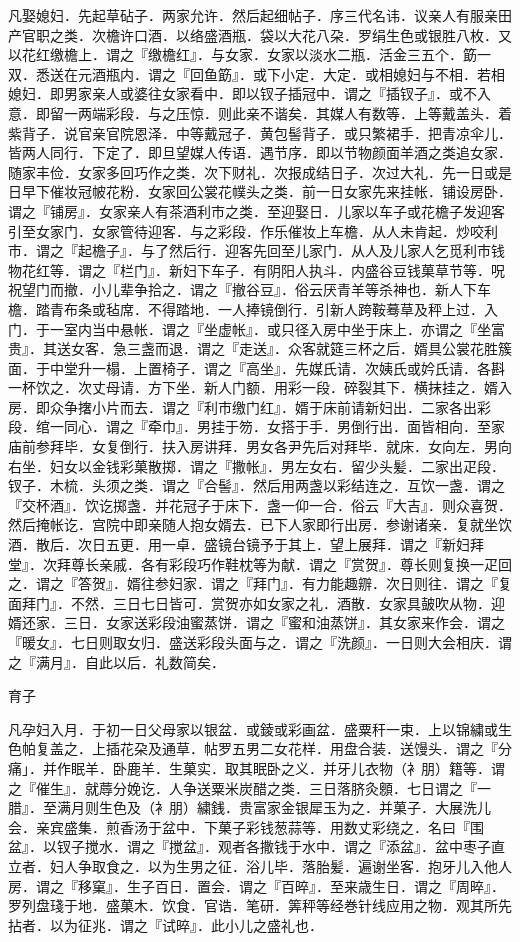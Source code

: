 \documentclass[]{article}
\begin{document}
凡娶媳妇．先起草砧子．两家允许．然后起细帖子．序三代名讳．议亲人有服亲田产官职之类．次檐许口酒．以络盛酒瓶．袋以大花八朶．罗绢生色或银胜八枚．又以花红缴檐上．谓之『缴檐红』．与女家．女家以淡水二瓶．活金三五个．筯一双．悉送在元酒瓶内．谓之『回鱼筯』．或下小定．大定．或相媳妇与不相．若相媳妇．即男家亲人或婆往女家看中．即以钗子插冠中．谓之『插钗子』．或不入意．即留一两端彩段．与之压惊．则此亲不谐矣．其媒人有数等．上等戴盖头．着紫背子．说官亲官院恩泽．中等戴冠子．黄包髻背子．或只繁裙手．把青凉伞儿．皆两人同行．下定了．即旦望媒人传语．遇节序．即以节物颜面羊酒之类追女家．随家丰俭．女家多回巧作之类．次下财礼．次报成结日子．次过大礼．先一日或是日早下催妆冠帔花粉．女家回公裳花幞头之类．前一日女家先来挂帐．铺设房卧．谓之『铺房』．女家亲人有茶酒利市之类．至迎娶日．儿家以车子或花檐子发迎客引至女家门．女家管待迎客．与之彩段．作乐催妆上车檐．从人未肯起．炒咬利市．谓之『起檐子』．与了然后行．迎客先回至儿家门．从人及儿家人乞觅利市钱物花红等．谓之『栏门』．新妇下车子．有阴阳人执斗．内盛谷豆钱菓草节等．呪祝望门而撤．小儿辈争拾之．谓之『撤谷豆』．俗云厌青羊等杀神也．新人下车檐．踏青布条或毡席．不得踏地．一人捧镜倒行．引新人跨鞍蓦草及秤上过．入门．于一室内当中悬帐．谓之『坐虚帐』．或只径入房中坐于床上．亦谓之『坐富贵』．其送女客．急三盏而退．谓之『走送』．众客就筵三杯之后．婿具公裳花胜簇面．于中堂升一榻．上置椅子．谓之『高坐』．先媒氏请．次姨氏或妗氏请．各斟一杯饮之．次丈母请．方下坐．新人门额．用彩一段．碎裂其下．横抹挂之．婿入房．即众争撦小片而去．谓之『利市缴门红』．婿于床前请新妇出．二家各出彩段．绾一同心．谓之『牵巾』．男挂于笏．女搭于手．男倒行出．面皆相向．至家庙前参拜毕．女复倒行．扶入房讲拜．男女各尹先后对拜毕．就床．女向左．男向右坐．妇女以金钱彩菓散掷．谓之『撒帐』．男左女右．留少头髪．二家出疋段．钗子．木梳．头须之类．谓之『合髻』．然后用两盏以彩结连之．互饮一盏．谓之『交杯酒』．饮讫掷盏．并花冠子于床下．盏一仰一合．俗云『大吉』．则众喜贺．然后掩帐讫．宫院中即亲随人抱女婿去．已下人家即行出房．参谢诸亲．复就坐饮酒．散后．次日五更．用一卓．盛镜台镜予于其上．望上展拜．谓之『新妇拜堂』．次拜尊长亲戚．各有彩段巧作鞋枕等为献．谓之『赏贺』．尊长则复换一疋回之．谓之『答贺』．婿往参妇家．谓之『拜门』．有力能趣辧．次日则往．谓之『复面拜门』．不然．三日七日皆可．赏贺亦如女家之礼．酒散．女家具皷吹从物．迎婿还家．三日．女家送彩段油蜜蒸饼．谓之『蜜和油蒸饼』．其女家来作会．谓之『暖女』．七日则取女归．盛送彩段头面与之．谓之『洗颜』．一日则大会相庆．谓之『满月』．自此以后．礼数简矣．

育子

凡孕妇入月．于初一日父母家以银盆．或錂或彩画盆．盛粟秆一束．上以锦繍或生色帕复盖之．上插花朶及通草．帖罗五男二女花样．用盘合装．送馒头．谓之『分痛」．并作眠羊．卧鹿羊．生菓实．取其眠卧之义．并牙儿衣物（衤朋）籍等．谓之『催生』．就蓐分娩讫．人争送粟米炭醋之类．三日落脐灸顖．七日谓之『一腊』．至满月则生色及（衤朋）繍銭．贵富家金银犀玉为之．并菓子．大展洗儿会．亲宾盛集．煎香汤于盆中．下菓子彩钱葱蒜等．用数丈彩绕之．名曰『围盆』．以钗子搅水．谓之『搅盆』．观者各撒钱于水中．谓之『添盆』．盆中枣子直立者．妇人争取食之．以为生男之征．浴儿毕．落胎髪．遍谢坐客．抱牙儿入他人房．谓之『移窠』．生子百日．置会．谓之『百晬』．至来歳生日．谓之『周晬』．罗列盘琖于地．盛菓木．饮食．官诰．笔研．筭秤等经巻针线应用之物．观其所先拈者．以为征兆．谓之『试晬』．此小儿之盛礼也．
\end{document}
